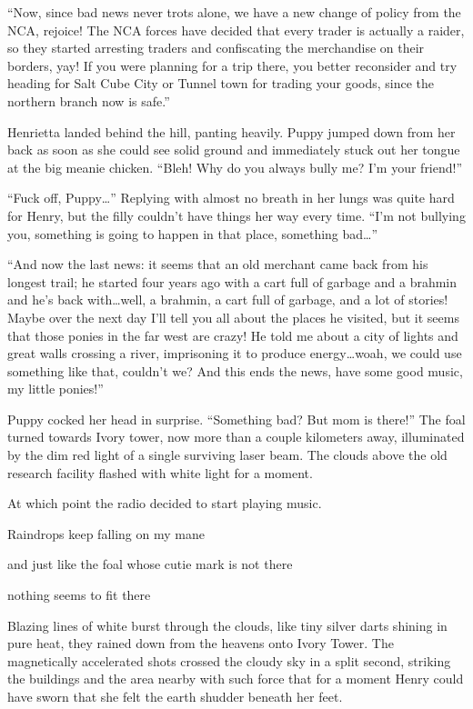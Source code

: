 ``{\rt Now, since bad news never trots alone, we have a new change of policy from the NCA, rejoice! The NCA forces have decided that every trader is actually a raider, so they started arresting traders and confiscating the merchandise on their borders, yay! If you were planning for a trip there, you better reconsider and try heading for Salt Cube City or Tunnel town for trading your goods, since the northern branch now is safe.}''

Henrietta landed behind the hill, panting heavily. Puppy jumped down from her back as soon as she could see solid ground and immediately stuck out her tongue at the big meanie chicken. ``Bleh! Why do you always bully me? I'm your friend!''

``Fuck off, Puppy\dots'' Replying with almost no breath in her lungs was quite hard for Henry, but the filly couldn't have things her way every time. ``I'm not bullying you, something is going to happen in that place, something bad\dots''

``{\rt And now the last news: it seems that an old merchant came back from his longest trail; he started four years ago with a cart full of garbage and a brahmin and he's back with\dots well, a brahmin, a cart full of garbage, and a lot of stories! Maybe over the next day I'll tell you all about the places he visited, but it seems that those ponies in the far west are crazy! He told me about a city of lights and great walls crossing a river, imprisoning it to produce energy\dots woah, we could use something like that, couldn't we? And this ends the news, have some good music, my little ponies!}''

Puppy cocked her head in surprise. ``Something bad? But mom is there!'' The foal turned towards Ivory tower, now more than a couple kilometers away, illuminated by the dim red light of a single surviving laser beam. The clouds above the old research facility flashed with white light for a moment.

At which point the radio decided to start playing music.


\begin{song}
    Raindrops keep falling on my mane

    and just like the foal whose cutie mark is not there

    nothing seems to fit there
\end{song}

Blazing lines of white burst through the clouds, like tiny silver darts shining in pure heat, they rained down from the heavens onto Ivory Tower. The magnetically accelerated shots crossed the cloudy sky in a split second, striking the buildings and the area nearby with such force that for a moment Henry could have sworn that she felt the earth shudder beneath her feet.

